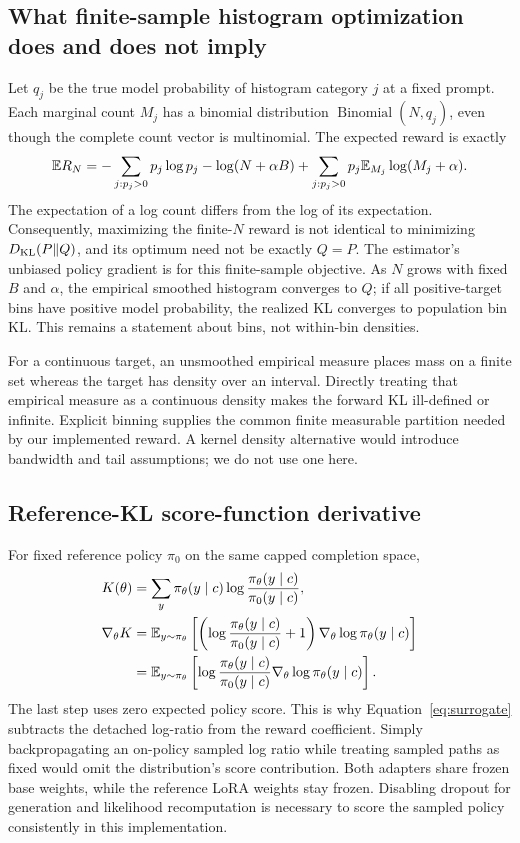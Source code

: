\subsection{What finite-sample histogram optimization does and does not imply}
\label{app:finite}
Let $q_j$ be the true model probability of histogram category $j$ at a
fixed prompt. Each marginal count $M_j$ has a binomial distribution
$\operatorname{Binomial}(N,q_j)$, even though the complete count vector is
multinomial. The expected reward is exactly
\begin{equation}
 \mathbb{E} R_N=-\sum_{j:p_j>0}p_j\log p_j-\log(N+\alpha B)
       +\sum_{j:p_j>0}p_j\mathbb{E}_{M_j}\log(M_j+\alpha).
 \label{eq:expectedreward}
\end{equation}
The expectation of a log count differs from the log of its expectation.
Consequently, maximizing the finite-$N$ reward is not identical to
minimizing $D_{\mathrm{KL}}(P\Vert Q)$, and its optimum need not be exactly $Q=P$.
The estimator's unbiased policy gradient is for this finite-sample
objective. As $N$ grows with fixed $B$ and $\alpha$, the empirical
smoothed histogram converges to $Q$; if all positive-target bins have
positive model probability, the realized KL converges to population bin
KL. This remains a statement about bins, not within-bin densities.

For a continuous target, an unsmoothed empirical measure places mass on a
finite set whereas the target has density over an interval. Directly
treating that empirical measure as a continuous density makes the
forward KL ill-defined or infinite. Explicit binning supplies the common
finite measurable partition needed by our implemented reward. A kernel
density alternative would introduce bandwidth and tail assumptions; we
do not use one here.

\subsection{Reference-KL score-function derivative}
\label{app:reference}
For fixed reference policy $\pi_0$ on the same capped completion space,
\begin{align}
 K(\theta)&=\sum_y\pi_\theta(y\mid c)
                  \log\frac{\pi_\theta(y\mid c)}{\pi_0(y\mid c)},\\
 \nabla_\theta K
 &=\mathbb{E}_{y\sim\pi_\theta}
   \left[\left(\log\frac{\pi_\theta(y\mid c)}{\pi_0(y\mid c)}+1\right)
            \nabla_\theta\log\pi_\theta(y\mid c)\right]\\
 &=\mathbb{E}_{y\sim\pi_\theta}
   \left[\log\frac{\pi_\theta(y\mid c)}{\pi_0(y\mid c)}
            \nabla_\theta\log\pi_\theta(y\mid c)\right].
\end{align}
The last step uses zero expected policy score. This is why
Equation~\eqref{eq:surrogate} subtracts the detached log-ratio from the
reward coefficient. Simply backpropagating an on-policy sampled log
ratio while treating sampled paths as fixed would omit the distribution's
score contribution. Both adapters share frozen base weights, while the
reference LoRA weights stay frozen. Disabling dropout for generation and
likelihood recomputation is necessary to score the sampled policy
consistently in this implementation.

